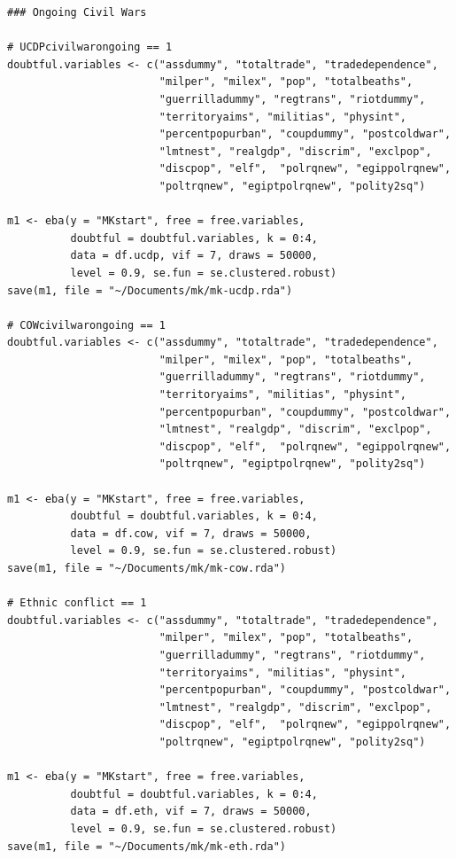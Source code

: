 \documentclass[a4paper,12pt]{article}
\begin{document}
\begin{verbatim}
### Ongoing Civil Wars

# UCDPcivilwarongoing == 1
doubtful.variables <- c("assdummy", "totaltrade", "tradedependence",
                        "milper", "milex", "pop", "totalbeaths",
                        "guerrilladummy", "regtrans", "riotdummy",
                        "territoryaims", "militias", "physint",
                        "percentpopurban", "coupdummy", "postcoldwar",
                        "lmtnest", "realgdp", "discrim", "exclpop",
                        "discpop", "elf",  "polrqnew", "egippolrqnew",
                        "poltrqnew", "egiptpolrqnew", "polity2sq")

m1 <- eba(y = "MKstart", free = free.variables,
          doubtful = doubtful.variables, k = 0:4,
          data = df.ucdp, vif = 7, draws = 50000,
          level = 0.9, se.fun = se.clustered.robust)
save(m1, file = "~/Documents/mk/mk-ucdp.rda")

# COWcivilwarongoing == 1
doubtful.variables <- c("assdummy", "totaltrade", "tradedependence",
                        "milper", "milex", "pop", "totalbeaths",
                        "guerrilladummy", "regtrans", "riotdummy",
                        "territoryaims", "militias", "physint",
                        "percentpopurban", "coupdummy", "postcoldwar",
                        "lmtnest", "realgdp", "discrim", "exclpop",
                        "discpop", "elf",  "polrqnew", "egippolrqnew",
                        "poltrqnew", "egiptpolrqnew", "polity2sq")

m1 <- eba(y = "MKstart", free = free.variables,
          doubtful = doubtful.variables, k = 0:4,
          data = df.cow, vif = 7, draws = 50000,
          level = 0.9, se.fun = se.clustered.robust)
save(m1, file = "~/Documents/mk/mk-cow.rda")

# Ethnic conflict == 1
doubtful.variables <- c("assdummy", "totaltrade", "tradedependence",
                        "milper", "milex", "pop", "totalbeaths",
                        "guerrilladummy", "regtrans", "riotdummy",
                        "territoryaims", "militias", "physint",
                        "percentpopurban", "coupdummy", "postcoldwar",
                        "lmtnest", "realgdp", "discrim", "exclpop", 
                        "discpop", "elf",  "polrqnew", "egippolrqnew",
                        "poltrqnew", "egiptpolrqnew", "polity2sq")

m1 <- eba(y = "MKstart", free = free.variables,
          doubtful = doubtful.variables, k = 0:4,
          data = df.eth, vif = 7, draws = 50000,
          level = 0.9, se.fun = se.clustered.robust)
save(m1, file = "~/Documents/mk/mk-eth.rda")


\end{verbatim}
\end{document}
